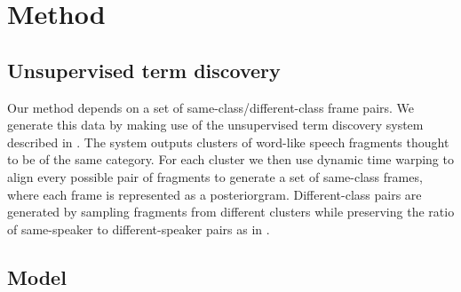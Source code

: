 \section{Method}
\label{sec:method}

\subsection{Unsupervised term discovery}
Our method depends on a set of same-class/different-class frame pairs.
We generate this data by making use of the unsupervised term discovery system described in \parencite{jansen2011efficient}.
The system outputs clusters of word-like speech fragments thought to be of the same category.
For each cluster we then use dynamic time warping to align every possible pair of fragments to generate a set of same-class frames, where each frame is represented as a posteriorgram.
Different-class pairs are generated by sampling fragments from different clusters while preserving the ratio of same-speaker to different-speaker pairs as in \parencite{thiolliere2015hybrid}.

\subsection{Model}




